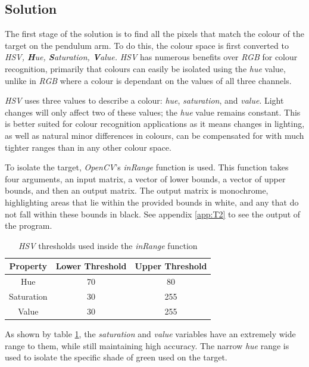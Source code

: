 \documentclass[conference]{IEEEtran}
\begin{document}
\subsection{Solution}\label{2_solution}
The first stage of the solution is to find all the pixels that match the colour of the target on the pendulum arm. To do this, the colour space is first converted to \textit{HSV, \textbf{H}ue, \textbf{S}aturation, \textbf{V}alue.} \textit{HSV} has numerous benefits over \textit{RGB} for colour recognition\cite{RBGvHSV}, primarily that colours can easily be isolated using the \textit{hue} value, unlike in \textit{RGB} where a colour is dependant on the values of all three channels.

 \textit{HSV} uses three values to describe a colour: \textit{hue}, \textit{saturation}, and \textit{value}. Light changes will only affect two of these values; the \textit{hue} value remains constant. This is better suited for colour recognition applications as it means changes in lighting, as well as natural minor differences in colours, can be compensated for with much tighter ranges than in any other colour space.

To isolate the target, \textit{OpenCV}'s \textit{inRange} function is used. This function takes four arguments, an input matrix, a vector of lower bounds, a vector of upper bounds, and then an output matrix. The output matrix is monochrome, highlighting areas that lie within the provided bounds in white, and any that do not fall within these bounds in black. See appendix \ref{app:T2} to see the output of the program.

\begin{table}[H]
\caption{\textit{HSV} thresholds used inside the \textit{inRange} function}
\label{tab:t2thresholds}
\centering
\begin{tabular}{|c||c|c|}
\hline
Property & Lower Threshold & Upper Threshold\\
\hline
Hue & 70 & 80\\
\hline
Saturation & 30 & 255\\
\hline
Value & 30 & 255\\
\hline
\end{tabular}
\end{table}

As shown by table \ref{tab:t2thresholds}, the \textit{saturation} and \textit{value} variables have an extremely wide range to them, while still maintaining high accuracy. The narrow \textit{hue} range is used to isolate the specific shade of green used on the target.
\end{document}
